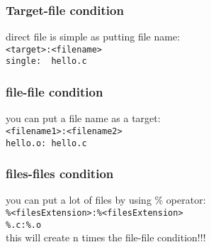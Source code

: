 \documentclass[12pt]{article}
\begin{document}
\subsubsection{Target-file condition}
direct file is simple as putting file name: \\
\verb|<target>:<filename>|\\
\verb|single:  hello.c|
\subsubsection{file-file condition}
you can put a file name as a target:\\
\verb|<filename1>:<filename2>|\\
\verb|hello.o: hello.c|
\subsubsection{files-files condition}
you can put a lot of files by using \% operator:\\
\verb|%<filesExtension>:%<filesExtension>|\\
\verb|%.c:%.o|\\
this will create n times the file-file condition!!!
\end{document}
